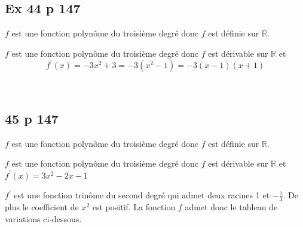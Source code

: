 \documentclass[12pt,a4paper]{book}
\begin{document}
\subsection*{Ex 44 p 147}
\begin{enumMet}
    \item $f$ est une fonction polynôme du troisième degré donc $f$ est définie sur $\mathbb{R}$.
    \item $f$ est une fonction polynôme du troisième degré donc $f$ est dérivable sur $\mathbb{R}$ et
$$
f^{\prime}(x)=-3 x^{2}+3=-3\left(x^{2}-1\right)=-3(x-1)(x+1)
$$
    \item \ \\
\end{enumMet}

\subsection*{45 p 147}
\begin{enumMet}
    \item $f$ est une fonction polynôme du troisième degré donc $f$ est définie sur $\mathbb{R}$.
    \item $f$ est une fonction polynôme du troisième degré donc $f$ est dérivable sur $\mathbb{R}$ et $f^{\prime}(x)=3 x^{2}-2 x-1$
    \item $f^{\prime}$ est une fonction trinôme du second degré qui admet deux racines 1 et $-\frac{1}{3}$. De plus le coefficient de $x^{2}$ est positif. La fonction $f$ admet donc le tableau de variations ci-dessous.\\
\end{enumMet}
\end{document}
